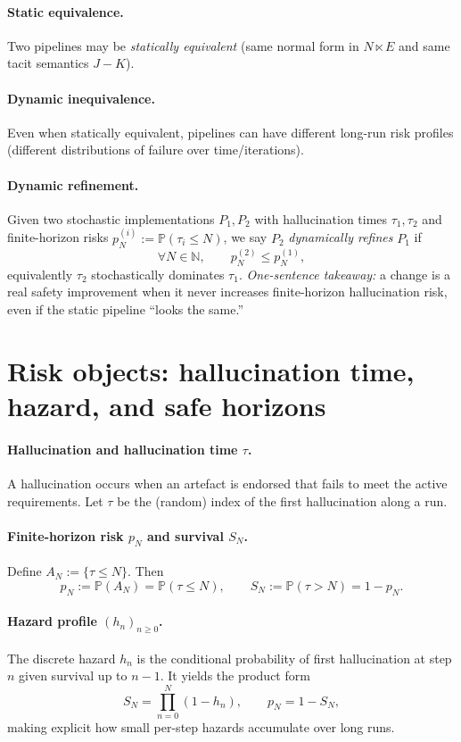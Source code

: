\paragraph{Static equivalence.}
Two pipelines may be \emph{statically equivalent} (same normal form in $N \ltimes E$ and same tacit
semantics $J{-}K$).

\paragraph{Dynamic inequivalence.}
Even when statically equivalent, pipelines can have different long-run risk profiles (different
distributions of failure over time/iterations).

\paragraph{Dynamic refinement.}
Given two stochastic implementations $P_1, P_2$ with hallucination times $\tau_1, \tau_2$ and finite-horizon
risks $p^{(i)}_N := \mathbb{P}(\tau_i \le N)$, we say $P_2$ \emph{dynamically refines} $P_1$ if
\[
\forall N \in \mathbb{N},\qquad p^{(2)}_N \le p^{(1)}_N,
\]
equivalently $\tau_2$ stochastically dominates $\tau_1$.
\emph{One-sentence takeaway:} a change is a real safety improvement when it never increases finite-horizon
hallucination risk, even if the static pipeline ``looks the same.''

\section{Risk objects: hallucination time, hazard, and safe horizons}
\label{sec:lookup-risk}

\paragraph{Hallucination and hallucination time $\tau$.}
A hallucination occurs when an artefact is endorsed that fails to meet the active requirements.
Let $\tau$ be the (random) index of the first hallucination along a run.

\paragraph{Finite-horizon risk $p_N$ and survival $S_N$.}
Define $A_N := \{\tau \le N\}$. Then
\[
p_N := \mathbb{P}(A_N) = \mathbb{P}(\tau \le N),
\qquad
S_N := \mathbb{P}(\tau > N) = 1 - p_N.
\]

\paragraph{Hazard profile $(h_n)_{n\ge 0}$.}
The discrete hazard $h_n$ is the conditional probability of first hallucination at step $n$
given survival up to $n-1$. It yields the product form
\[
S_N = \prod_{n=0}^{N} (1 - h_n),
\qquad
p_N = 1 - S_N,
\]
making explicit how small per-step hazards accumulate over long runs.

